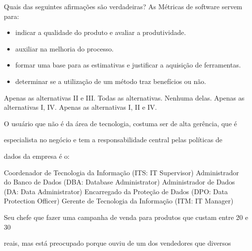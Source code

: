 \documentclass[12pt, addpoints]{exam}
\begin{document}
    \begin{questions}

    \newpage
    \question

Quais das seguintes afirmações são verdadeiras? As Métricas de software servem para:



\begin{itemize}

    \item[I)] indicar a qualidade do produto e avaliar a produtividade.

    \item[II)] auxiliar na melhoria do processo.

    \item[III)] formar uma base para as estimativas e justificar a aquisição de ferramentas.

    \item[IV)] determinar se a utilização de um método traz benefícios ou não.

\end{itemize}
\begin{choices}
\choice Apenas as alternativas II e III.
\choice Todas as alternativas.
\choice Nenhuma delas.
\choice Apenas as alternativas I, IV.
\choice Apenas as alternativas I, II e IV.
\end{choices}

\question

O usuário que não é da área de tecnologia, costuma ser de alta gerência, que é

especialista no negócio e tem a responsabilidade central pelas políticas de

dados da empresa é o:
\begin{choices}
\choice Coordenador de Tecnologia da Informação (ITS: IT Supervisor)
\choice Administrador do Banco de Dados (DBA: Database Administrator)
\choice Administrador de Dados (DA: Data Administrator)
\choice Encarregado da Proteção de Dados (DPO: Data Protection Officer)
\choice Gerente de Tecnologia da Informação (ITM: IT Manager)
\end{choices}

\question

Seu chefe que fazer uma campanha de venda para produtos que custam entre 20 e 30

reais, mas está preocupado porque ouviu de um dos vendedores que diversos


\end{questions}
\end{document}
